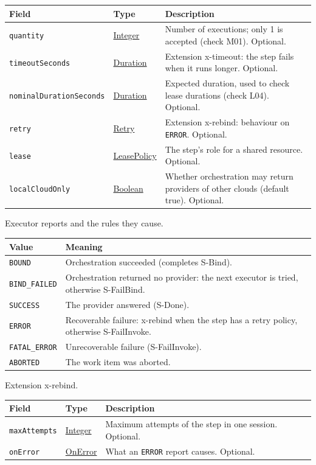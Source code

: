 \documentclass[a4paper]{arrowhead}
\newcommand{\mref}[1]{{\textcolor{ArrowheadPurple}{\hyperref[sec:model:#1]{#1}}}}
\newcommand{\pref}[1]{{\textcolor{ArrowheadGrey}{\hyperref[sec:model:primitives:#1]{#1}}}}
\begin{document}
{\small
\begin{longtable}{|p{3.9cm}|p{4.4cm}|p{7.5cm}|}

\hline
\rowcolor{gray!33} Field & Type & Description \\ \hline
\endhead
\texttt{quantity} & \pref{Integer} & Number of executions; only 1 is accepted (check M01). Optional. \\ \hline
\texttt{timeoutSeconds} & \pref{Duration} & Extension x-timeout: the step fails when it runs longer. Optional. \\ \hline
\texttt{nominalDurationSeconds} & \pref{Duration} & Expected duration, used to check lease durations (check L04). Optional. \\ \hline
\texttt{retry} & \mref{Retry} & Extension x-rebind: behaviour on \texttt{ERROR}. Optional. \\ \hline
\texttt{lease} & \mref{LeasePolicy} & The step's role for a shared resource. Optional. \\ \hline
\texttt{localCloudOnly} & \pref{Boolean} & Whether orchestration may return providers of other clouds (default true). Optional. \\ \hline
\end{longtable}
}

Executor reports and the rules they cause.

{\small
\begin{longtable}{|p{3.9cm}|p{11.9cm}|}

\hline
\rowcolor{gray!33} Value & Meaning \\ \hline
\endhead
\texttt{BOUND} & Orchestration succeeded (completes S-Bind). \\ \hline
\texttt{BIND\_FAILED} & Orchestration returned no provider: the next executor is tried, otherwise S-FailBind. \\ \hline
\texttt{SUCCESS} & The provider answered (S-Done). \\ \hline
\texttt{ERROR} & Recoverable failure: x-rebind when the step has a retry policy, otherwise S-FailInvoke. \\ \hline
\texttt{FATAL\_ERROR} & Unrecoverable failure (S-FailInvoke). \\ \hline
\texttt{ABORTED} & The work item was aborted. \\ \hline
\end{longtable}
}

Extension x-rebind.

{\small
\begin{longtable}{|p{3.9cm}|p{4.4cm}|p{7.5cm}|}

\hline
\rowcolor{gray!33} Field & Type & Description \\ \hline
\endhead
\texttt{maxAttempts} & \pref{Integer} & Maximum attempts of the step in one session. Optional. \\ \hline
\texttt{onError} & \mref{OnError} & What an \texttt{ERROR} report causes. Optional. \\ \hline
\end{longtable}
}
\end{document}
